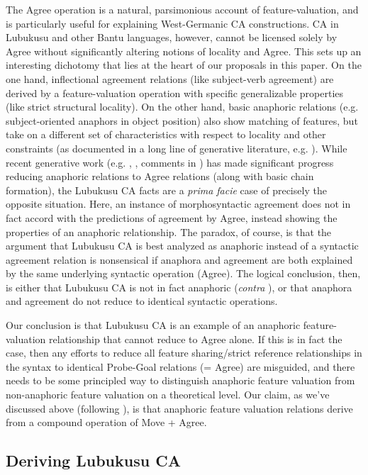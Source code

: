 \documentclass[output=paper
,modfonts
,nonflat
]{langsci/langscibook}
\begin{document}
The Agree operation is a natural, parsimonious account of feature-valuation, and is particularly useful for explaining West-Germanic CA constructions. CA in Lubukusu and other Bantu languages, however, cannot be licensed solely by Agree without significantly altering notions of locality and Agree.  
This sets up an interesting dichotomy that lies at the heart of our proposals in this paper. On the one hand, inflectional agreement relations (like subject-verb agreement) are derived by a feature-valuation operation with specific generalizable properties (like strict structural locality). On the other hand, basic anaphoric relations (e.g. subject-oriented anaphors in object position) also show matching of features, but take on a different set of characteristics with respect to locality and other constraints (as documented in a long line of generative literature, e.g. \citealt{Chomsky:1981,Safir:2004,Reuland:2011}). While recent generative work (e.g. \citealt{Reuland:2011}, \citealt{Hicks:2009}, comments in \citealt{Wurmbrand:2011}) has made significant progress reducing anaphoric relations to Agree relations (along with basic chain formation), the Lubukusu CA facts are a \textit{prima facie} case of precisely the opposite situation. Here, an instance of morphosyntactic agreement does not in fact accord with the predictions of agreement by Agree, instead showing the properties of an anaphoric relationship. The paradox, of course, is that the argument that Lubukusu CA is best analyzed as anaphoric instead of a syntactic agreement relation is nonsensical if anaphora and agreement are both explained by the same underlying syntactic operation (Agree). The logical conclusion, then, is either that Lubukusu CA is not in fact anaphoric (\textit{contra} \citealt{Diercks:2013}), or that anaphora and agreement do not reduce to identical syntactic operations.

Our conclusion is that Lubukusu CA is an example of an anaphoric feature-valuation relationship that cannot reduce to Agree alone. If this is in fact the case, then any efforts to reduce all feature sharing/strict reference relationships in the syntax to identical Probe-Goal relations (= Agree) are misguided, and there needs to be some principled way to distinguish anaphoric feature valuation from non-anaphoric feature valuation on a theoretical level. Our claim, as we’ve discussed above (following \citealt{Rooryck:2011}), is that anaphoric feature valuation relations derive from a compound operation of Move + Agree.

\subsection{Deriving Lubukusu CA}
\end{document}
